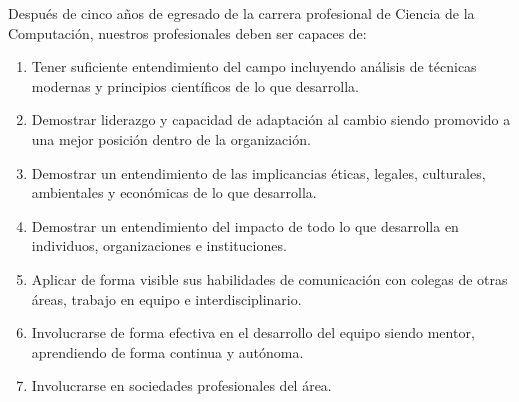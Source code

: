 Después de cinco años de egresado de la carrera profesional de Ciencia de la Computación, nuestros profesionales deben ser capaces de:
\begin{enumerate}
\item Tener suficiente entendimiento del campo incluyendo análisis de técnicas modernas y principios cientí­ficos de lo que desarrolla.
\item Demostrar liderazgo y capacidad de adaptación al cambio siendo promovido a una mejor posición dentro de la organización.
\item Demostrar un entendimiento de las implicancias éticas, legales, culturales, ambientales y económicas de lo que desarrolla.
\item Demostrar un entendimiento del impacto de todo lo que desarrolla en individuos, organizaciones e instituciones.
\item Aplicar de forma visible sus habilidades de comunicación con colegas de otras áreas, trabajo en equipo e interdisciplinario.
\item Involucrarse de forma efectiva en el desarrollo del equipo siendo mentor, aprendiendo de forma continua y autónoma.
\item Involucrarse en sociedades profesionales del área.
\end{enumerate}